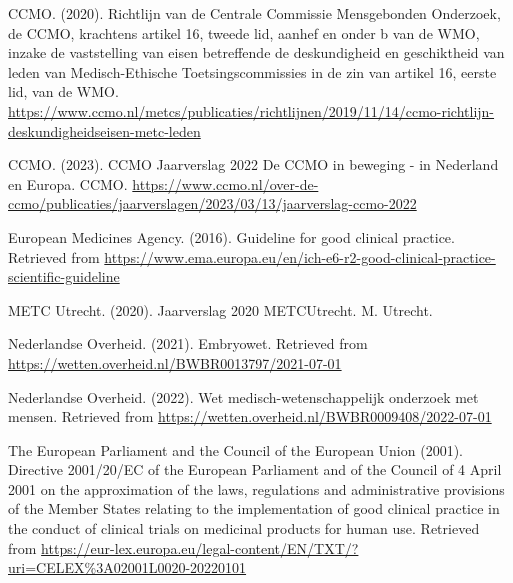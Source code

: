 \documentclass[authordate, empirical]{jote-new-article}
\begin{document}
	CCMO. (2020). {Richtlijn van de Centrale Commissie Mensgebonden Onderzoek, de CCMO, krachtens artikel 16, tweede lid, aanhef en onder b van de WMO, inzake de vaststelling van eisen betreffende de deskundigheid en geschiktheid van leden van Medisch-Ethische Toetsingscommissies in de zin van artikel 16, eerste lid, van de WMO}. \href{https://www.ccmo.nl/metcs/publicaties/richtlijnen/2019/11/14/ccmo-richtlijn-deskundigheidseisen-metc-leden}{https://www.ccmo.nl/metcs/publicaties/richtlijnen/2019/11/14/ccmo-richtlijn-deskundigheidseisen-metc-leden}



	CCMO. (2023). {CCMO Jaarverslag 2022 De CCMO in beweging - in Nederland en Europa}. CCMO. \href{https://www.ccmo.nl/over-de-ccmo/publicaties/jaarverslagen/2023/03/13/jaarverslag-ccmo-2022}{https://www.ccmo.nl/over-de-ccmo/publicaties/jaarverslagen/2023/03/13/jaarverslag-ccmo-2022}



	European Medicines Agency. (2016). {Guideline for good clinical practice}. Retrieved from \href{https://www.ema.europa.eu/en/ich-e6-r2-good-clinical-practice-scientific-guideline}{https://www.ema.europa.eu/en/ich-e6-r2-good-clinical-practice-scientific-guideline}



	METC Utrecht. (2020). {Jaarverslag 2020 METCUtrecht}. M. Utrecht.



	Nederlandse Overheid. (2021). {Embryowet}. Retrieved from \href{https://wetten.overheid.nl/BWBR0013797/2021-07-01}{https://wetten.overheid.nl/BWBR0013797/2021-07-01}



	Nederlandse Overheid. (2022). {Wet medisch-wetenschappelijk onderzoek met mensen}. Retrieved from \href{https://wetten.overheid.nl/BWBR0009408/2022-07-01}{https://wetten.overheid.nl/BWBR0009408/2022-07-01}



	The European Parliament and the Council of the European Union (2001). {Directive 2001/20/EC of the European Parliament and of the Council of 4 April 2001 on the approximation of the laws, regulations and administrative provisions of the Member States relating to the implementation of good clinical practice in the conduct of clinical trials on medicinal products for human use}. Retrieved from \href{https://eur-lex.europa.eu/legal-content/EN/TXT/?uri=CELEX%3A02001L0020-20220101}{https://eur-lex.europa.eu/legal-content/EN/TXT/?uri=CELEX\%3A02001L0020-20220101}
\end{document}
